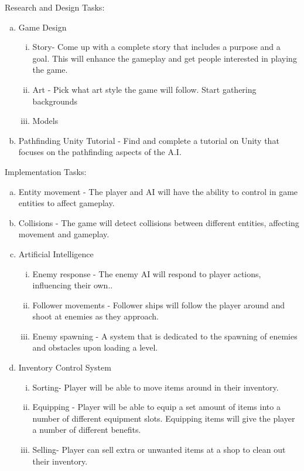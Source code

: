 \documentclass[12pt]{article}       %
\begin{document}
\begin{enumerate}[A.]
{\bf \item Research and Design Tasks:}
     \begin{enumerate}[a.]
	\item Game Design
        \begin{enumerate}[i.]
	\item Story- Come up with a complete story that includes a purpose and a goal. This will enhance the gameplay and get people interested in playing the game.
         \item Art - Pick what art style the game will follow. Start gathering backgrounds  
        \item Models
	\end{enumerate}
        \item Pathfinding Unity Tutorial - Find and complete a tutorial on Unity that focuses on the pathfinding aspects of the A.I.
	\end{enumerate}

{\bf \item Implementation Tasks:}
\begin{enumerate}[a.]
	
\item Entity movement - The player and AI will have the ability to control in game entities to affect gameplay. 

\item Collisions - The game will detect collisions between different entities, affecting movement and gameplay.

\item Artificial Intelligence

\begin{enumerate}[i.]
\item Enemy response - The enemy AI will respond to player actions, influencing their own..
\item Follower movements - Follower ships will follow the player around and shoot at enemies as they approach.
\item Enemy spawning - A system that is dedicated to the spawning of enemies and obstacles upon loading a level.
\end{enumerate}

\item Inventory Control System
\begin{enumerate}[i.]
\item Sorting- Player will be able to move items around in their inventory.
\item Equipping - Player will be able to equip a set amount of items into a number of different equipment slots. Equipping items will give the player a number of different benefits.
\item Selling- Player can sell extra or unwanted items at a shop to clean out their inventory.
\end{enumerate}


\end{enumerate}
\end{enumerate}
\end{document}
